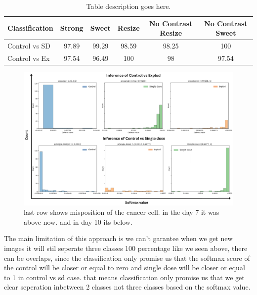 \begin{table}[H]
  \centering
  \begin{tabular}{@{}lccccc@{}} 
  \toprule
  \textbf{Classification} & \textbf{Strong} & \textbf{Sweet} & \textbf{Resize} & \textbf{No Contrast Resize} & \textbf{No Contrast Sweet} \\ \midrule
  Control vs SD             & 97.89           & 99.29          & 98.59           & 98.25                       & 100                        \\
  Control vs Ex             & 97.54               & 96.49              & 100               & 98                          &   97.54                        \\ \bottomrule
  \end{tabular}
  \caption{Table description goes here.}
  \label{tab:ranking softmax}
\end{table}

\begin{figure}[H]
  \centering
  \includegraphics[scale=0.4]{figures/softmax.pdf} 
  \caption{last row shows misposition of the cancer cell. in the day 7 it was above now. and in day 10 its below.}
  \label{fig:unloss}
\end{figure}

The main limitation of this approach is we can't garantee when we get new images it will stil seperate three classes 100 percentage like we seen above, there can be overlaps, since the classification only promise us that the softmax score of the control will be closer or equal to zero and  single dose will be closer or equal to 1 in control vs sd case. that means classification only promise us that we get clear seperation inbetween 2 classes not three classes based on the softmax value.




